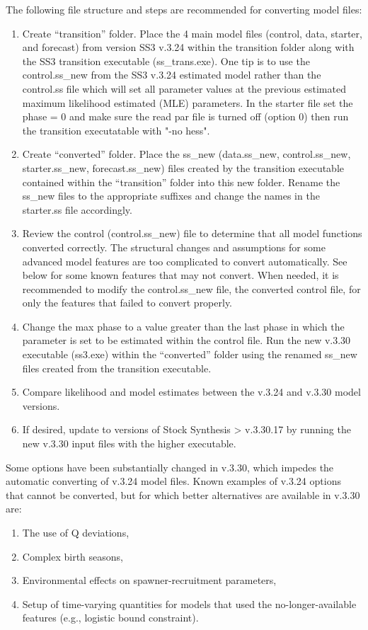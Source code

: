 The following file structure and steps are recommended for converting model files:
\begin{enumerate}
	\item Create ``transition'' folder.  Place the 4 main model files (control, data, starter, and forecast) from version SS3 v.3.24 within the transition folder along with the SS3 transition executable (ss\_trans.exe).  One tip is to use the control.ss\_new from the SS3 v.3.24 estimated model rather than the control.ss file which will set all parameter values at the previous estimated maximum likelihood estimated (MLE) parameters.  In the starter file set the phase = 0 and make sure the read par file is turned off (option 0) then run the transition executatable with "-no hess".
	
	\item Create ``converted'' folder.  Place the ss\_new (data.ss\_new, control.ss\_new, starter.ss\_new, forecast.ss\_new) files created by the transition executable contained within the ``transition'' folder into this new folder.  Rename the ss\_new files to the appropriate suffixes and change the names in the starter.ss file accordingly.
	
	\item Review the control (control.ss\_new) file to determine that all model functions converted correctly.  The structural changes and assumptions for some advanced model features are too complicated to convert automatically.  See below for some known features that may not convert. When needed, it is recommended to modify the control.ss\_new file, the converted control file, for only the features that failed to convert properly.
	
	\item Change the max phase to a value greater than the last phase in which the parameter is set to be estimated within the control file.  Run the new v.3.30 executable (ss3.exe) within the ``converted'' folder using the renamed ss\_new files created from the transition executable.
	
	\item Compare likelihood and model estimates between the v.3.24 and v.3.30 model versions.
	
	\item If desired, update to versions of Stock Synthesis > v.3.30.17 by running the new v.3.30 input files with the higher executable.
\end{enumerate}

\noindent Some options have been substantially changed in v.3.30, which impedes the automatic converting of v.3.24 model files. Known examples of v.3.24 options that cannot be converted, but for which better alternatives are available in v.3.30 are:
\begin{enumerate}
	\item The use of Q deviations,
	\item Complex birth seasons,
	\item Environmental effects on spawner-recruitment parameters,
	\item Setup of time-varying quantities for models that used the no-longer-available features (e.g., logistic bound constraint).\end{enumerate}

\pagebreak
